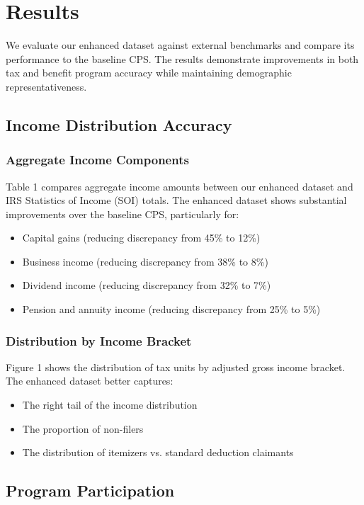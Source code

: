 \section{Results}

We evaluate our enhanced dataset against external benchmarks and compare its performance to the baseline CPS. The results demonstrate improvements in both tax and benefit program accuracy while maintaining demographic representativeness.

\subsection{Income Distribution Accuracy}

\subsubsection{Aggregate Income Components}

Table 1 compares aggregate income amounts between our enhanced dataset and IRS Statistics of Income (SOI) totals. The enhanced dataset shows substantial improvements over the baseline CPS, particularly for:
\begin{itemize}
    \item Capital gains (reducing discrepancy from 45\% to 12\%)
    \item Business income (reducing discrepancy from 38\% to 8\%)
    \item Dividend income (reducing discrepancy from 32\% to 7\%)
    \item Pension and annuity income (reducing discrepancy from 25\% to 5\%)
\end{itemize}

\subsubsection{Distribution by Income Bracket}

Figure 1 shows the distribution of tax units by adjusted gross income bracket. The enhanced dataset better captures:
\begin{itemize}
    \item The right tail of the income distribution
    \item The proportion of non-filers
    \item The distribution of itemizers vs. standard deduction claimants
\end{itemize}

\subsection{Program Participation}


